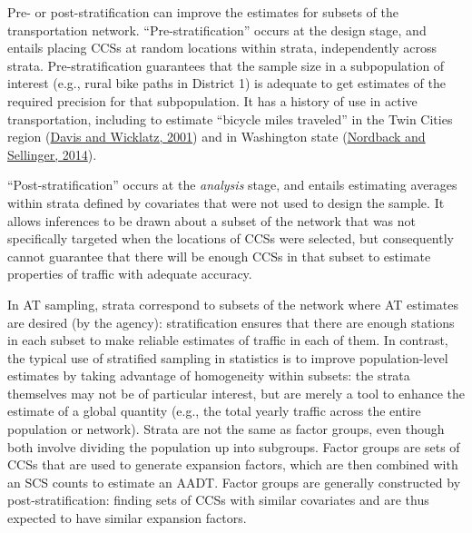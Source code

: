 \documentclass[11pt]{article}
\begin{document}
Pre- or post-stratification can improve the estimates for subsets of the
transportation network. ``Pre-stratification'' occurs at the design
stage, and entails placing CCSs at random locations within strata,
independently across strata. Pre-stratification guarantees that the
sample size in a subpopulation of interest (e.g., rural bike paths in
District 1) is adequate to get estimates of the required precision for
that subpopulation. It has a history of use in active transportation,
including to estimate ``bicycle miles traveled'' in the Twin Cities
region
(\href{https://www.cts.umn.edu/publications/report/sample-based-estimation-of-bicycle-miles-of-travel-bmt}{Davis
and Wicklatz, 2001}) and in Washington state
(\href{https://www.wsdot.wa.gov/research/reports/fullreports/828.1.pdf}{Nordback
and Sellinger, 2014}).

``Post-stratification'' occurs at the \emph{analysis} stage, and entails
estimating averages within strata defined by covariates that were not
used to design the sample. It allows inferences to be drawn about a
subset of the network that was not specifically targeted when the
locations of CCSs were selected, but consequently cannot guarantee that
there will be enough CCSs in that subset to estimate properties of
traffic with adequate accuracy.

In AT sampling, strata correspond to subsets of the network where AT
estimates are desired (by the agency): stratification ensures that there
are enough stations in each subset to make reliable estimates of traffic
in each of them. In contrast, the typical use of stratified sampling in
statistics is to improve population-level estimates by taking advantage
of homogeneity within subsets: the strata themselves may not be of
particular interest, but are merely a tool to enhance the estimate of a
global quantity (e.g., the total yearly traffic across the entire
population or network). Strata are not the same as factor groups, even
though both involve dividing the population up into subgroups. Factor
groups are sets of CCSs that are used to generate expansion factors,
which are then combined with an SCS counts to estimate an AADT. Factor
groups are generally constructed by post-stratification: finding sets of
CCSs with similar covariates and are thus expected to have similar
expansion factors.
\end{document}
